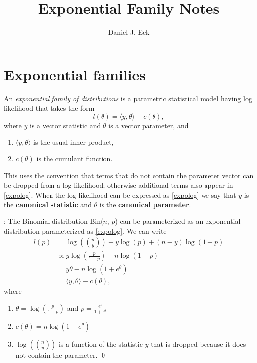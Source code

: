 \documentclass[12pt]{article}
\title{Exponential Family Notes}
\author{Daniel J. Eck}
\date{}
\newcommand{\inner}[1]{\langle #1 \rangle}
\begin{document}
\maketitle


\section*{Exponential families}

An \emph{exponential family of distributions} is a parametric statistical model having log likelihood that takes the form 
\begin{equation} \label{expolog}
	l(\theta) = \inner{y, \theta} - c(\theta),
\end{equation}
where $y$ is a vector statistic and $\theta$ is a vector parameter, and 
\begin{enumerate}
	\item[] $\inner{y,\theta}$ is the usual inner product,
	\item[] $c(\theta)$ is the cumulant function.
\end{enumerate}
This uses the convention that terms that do not contain the parameter vector can be dropped from a log likelihood; otherwise additional terms also appear in \eqref{expolog}. When the log likelihood can be expressed as \eqref{expolog} we say that $y$ is the {\bf canonical statistic} and $\theta$ is the {\bf canonical parameter}.

\vspace{0.5cm}: The Binomial distribution Bin($n$, $p$) can be parameterized as an exponential distribution parameterized as \eqref{expolog}. We can write
\begin{align*}
    l(p) &= \log\left({n \choose y}\right) + y\log(p) +(n-y)\log(1-p) \\
  	  &\propto y\log\left(\frac{p}{1-p}\right) + n\log(1 - p) \\
  	  &= y\theta - n\log\left(1 + e^\theta\right) \\
  	  &= \inner{y,\theta} - c(\theta),
\end{align*}
where 
\begin{enumerate}
	\item[] $\theta = \log\left(\frac{p}{1-p}\right)$ and $p = \frac{e^\theta}{1 + e^\theta}$
	\item[] $c(\theta) = n\log\left(1 + e^\theta\right)$
	\item[] $\log\left({n \choose y}\right)$ is a function of the statistic $y$ that is dropped because it does not contain the parameter. \qed
\end{enumerate}
\end{document}
